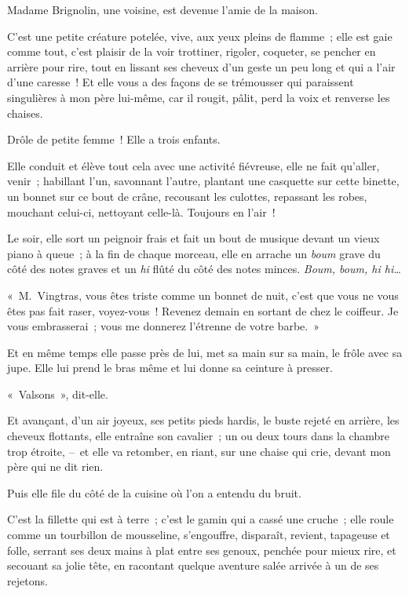 \documentclass[french,twoside]{book} %
\begin{document}
\noindent Madame Brignolin, une voisine, est devenue l’amie de la maison.\par
C’est une petite créature potelée, vive, aux yeux pleins de flamme ; elle est gaie comme tout, c’est plaisir de la voir trottiner, rigoler, coqueter, se pencher en arrière pour rire, tout en lissant ses cheveux d’un geste un peu long et qui a l’air d’une caresse ! Et elle vous a des façons de se trémousser qui paraissent singulières à mon père lui-même, car il rougit, pâlit, perd la voix et renverse les chaises.\par
Drôle de petite femme ! Elle a trois enfants.\par
Elle conduit et élève tout cela avec une activité fiévreuse, elle ne fait qu’aller, venir ; habillant l’un, savonnant l’autre, plantant une casquette sur cette binette, un bonnet sur ce bout de crâne, recousant les culottes, repassant les robes, mouchant celui-ci, nettoyant celle-là. Toujours en l’air !\par
Le soir, elle sort un peignoir frais et fait un bout de musique devant un vieux piano à queue ; à la fin de chaque morceau, elle en arrache un \emph{boum} grave du côté des notes graves et un \emph{hi} flûté du côté des notes minces. \emph{Boum, boum, hi hi…}\par
\bigbreak
\noindent « M. Vingtras, vous êtes triste comme un bonnet de nuit, c’est que vous ne vous êtes pas fait raser, voyez-vous ! Revenez demain en sortant de chez le coiffeur. Je vous embrasserai ; vous me donnerez l’étrenne de votre barbe. »\par
Et en même temps elle passe près de lui, met sa main sur sa main, le frôle avec sa jupe. Elle lui prend le bras même et lui donne sa ceinture à presser.\par
« Valsons », dit-elle.\par
Et avançant, d’un air joyeux, ses petits pieds hardis, le buste rejeté en arrière, les cheveux flottants, elle entraîne son cavalier ; un ou deux tours dans la chambre trop étroite, – et elle va retomber, en riant, sur une chaise qui crie, devant mon père qui ne dit rien.\par
Puis elle file du côté de la cuisine où l’on a entendu du bruit.\par
C’est la fillette qui est à terre ; c’est le gamin qui a cassé une cruche ; elle roule comme un tourbillon de mousseline, s’engouffre, disparaît, revient, tapageuse et folle, serrant ses deux mains à plat entre ses genoux, penchée pour mieux rire, et secouant sa jolie tête, en racontant quelque aventure salée arrivée à un de ses rejetons.\par
\end{document}
